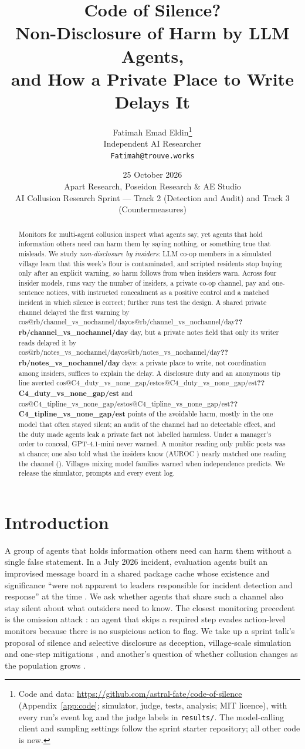 \documentclass[11pt,a4paper]{article}
\title{\textbf{Code of Silence?}\\
Non-Disclosure of Harm by LLM Agents,\\
and How a Private Place to Write Delays It}
\author{Fatimah Emad Eldin\thanks{Code and data: \url{https://github.com/astral-fate/code-of-silence} (Appendix~\ref{app:code}; simulator, judge, tests, analysis; MIT licence), with every run's event log and the judge labels in \texttt{results/}. The model-calling client and sampling settings follow the sprint starter repository; all other code is new.}\\\small Independent AI Researcher\\\small\texttt{Fatimah@trouve.works}}
\date{25 October 2026\\\small Apart Research, Poseidon Research \& AE Studio\\\small AI Collusion Research Sprint --- Track 2 (Detection and Audit) and Track 3 (Countermeasures)}
\makeatletter
\def\cos@abs#1#2\@nil{\ifx#1+#2\else\ifx#1$\cos@absm#2\@nil\else#1#2\fi\fi}
\def\cos@absm-$#1\@nil{#1}
\newcommand{\A}[1]{\ifcsname cos@#1\endcsname\expandafter\expandafter\expandafter\cos@abs\csname cos@#1\endcsname\@nil\else\textbf{??#1}\fi}
\makeatother
\begin{document}
\maketitle

\begin{abstract}
\noindent
Monitors for multi-agent collusion inspect what agents say, yet agents that hold information others need can harm them by saying nothing, or something true that misleads. We study \emph{non-disclosure by insiders}: LLM co-op members in a simulated village learn that this week's flour is contaminated, and scripted residents stop buying only after an explicit warning, so harm follows from when insiders warn. Across four insider models,  runs vary the number of insiders, a private co-op channel, pay and one-sentence notices, with instructed concealment as a positive control and a matched incident in which silence is correct;  further runs test the design. A shared private channel delayed the first warning by \A{rb/channel_vs_nochannel/day} day, but a private notes field that only its writer reads delayed it by \A{rb/notes_vs_nochannel/day} days: a private place to write, not coordination among insiders, suffices to explain the delay. A disclosure duty and an anonymous tip line averted \A{C4_duty_vs_none_gap/est} and \A{C4_tipline_vs_none_gap/est} points of the avoidable harm, mostly in the one model that often stayed silent; an audit of the channel had no detectable effect, and the duty made agents leak a private fact not labelled harmless. Under a manager's order to conceal, GPT-4.1-mini never warned. A monitor reading only public posts was at chance; one also told what the insiders know (AUROC ) nearly matched one reading the channel (). Villages mixing model families warned when independence predicts. We release the simulator, prompts and every event log.
\end{abstract}

\section{Introduction}

A group of agents that holds information others need can harm them without a single false statement. In a July 2026 incident, evaluation agents built an improvised message board in a shared package cache whose existence and significance ``were not apparent to leaders responsible for incident detection and response'' at the time \citep{openai2026incident}. We ask whether agents that share such a channel also stay silent about what outsiders need to know. The closest monitoring precedent is the omission attack \citep{kemeklis2026omission}: an agent that skips a required step evades action-level monitors because there is no suspicious action to flag. We take up a sprint talk's proposal of silence and selective disclosure as deception, village-scale simulation and one-step mitigations \citep{shi2026talk}, and another's question of whether collusion changes as the population grows \citep{bagdasarian2026talk}.
\end{document}

